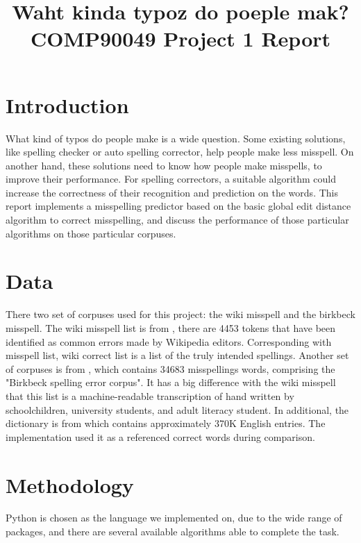 \documentclass[11pt]{article}
\title{Waht kinda typoz do poeple mak?\\
	\large COMP90049 Project 1 Report}
\begin{document}
\maketitle

\section{Introduction}
What kind of typos do people make is a wide question. Some existing solutions, like spelling checker or auto spelling corrector, help people make less misspell. On another hand, these solutions need to know how people make misspells, to improve their performance. For spelling correctors, a suitable algorithm could increase the correctness of their recognition and prediction on the words. This report implements a misspelling predictor based on the basic global edit distance algorithm to correct misspelling, and discuss the performance of those particular algorithms on those particular corpuses.


\section{Data}
There two set of corpuses used for this project: the wiki misspell and the birkbeck misspell. The wiki misspell list is from , there are 4453 tokens that have been identified as common errors made by Wikipedia editors. Corresponding with misspell list,  wiki correct list is a list of the truly intended spellings. Another set of corpuses is from , which contains 34683 misspellings words, comprising the "Birkbeck spelling error corpus". It has a big difference with the wiki misspell that this list is a machine-readable transcription of hand written by schoolchildren, university students, and adult literacy student. In additional, the dictionary is from \cite{EnglishWords} which contains approximately 370K English entries. The implementation used it as a referenced correct words during comparison.

\section{Methodology}
Python is chosen as the language we implemented on, due to the wide range of packages, and there are several available algorithms able to complete the task.
\end{document}
